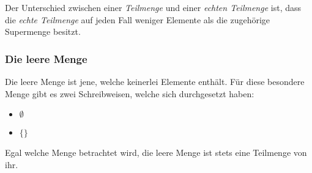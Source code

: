 \begin{warning}
	Der Unterschied zwischen einer \textit{Teilmenge} und einer \textit{echten Teilmenge} ist, dass die \textit{echte Teilmenge} auf jeden Fall weniger Elemente als die zugehörige Supermenge besitzt.
\end{warning}

\subsubsection{Die leere Menge}
Die leere Menge ist jene, welche keinerlei Elemente enthält.
Für diese besondere Menge gibt es zwei Schreibweisen, welche sich durchgesetzt haben:
\begin{itemize}
	\item $\emptyset$
	\item $\{\}$
\end{itemize}
\begin{warning}
	Egal welche Menge betrachtet wird, die leere Menge ist stets eine Teilmenge von ihr.
\end{warning}